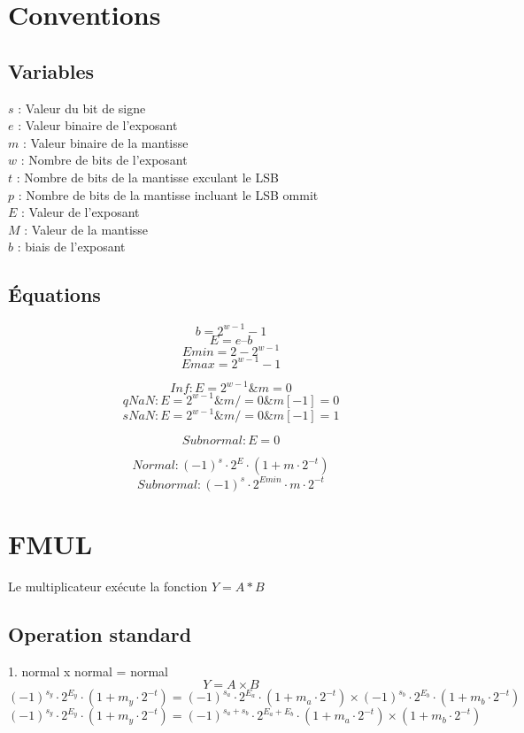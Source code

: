 \documentclass[letterpaper, 12pt]{article}
\begin{document}

\section{Conventions}

\subsection{Variables}
$s$ : Valeur du bit de signe\\
$e$ : Valeur binaire de l'exposant\\
$m$ : Valeur binaire de la mantisse\\
$w$ : Nombre de bits de l'exposant\\
$t$ : Nombre de bits de la mantisse exculant le LSB\\
$p$ : Nombre de bits de la mantisse incluant le LSB ommit\\
$E$ : Valeur de l’exposant\\
$M$ : Valeur de la mantisse\\
$b$ : biais de l'exposant\\

\subsection{Équations}

$$b = 2^{w-1}-1$$
$$E = e – b$$
$$Emin = 2-2^{w-1}$$
$$Emax = 2^{w-1}-1$$

$$Inf : E=2^{w-1} \& m=0$$
$$qNaN : E=2^{w-1} \& m/=0 \& m[-1]=0$$
$$sNaN : E=2^{w-1} \& m/=0 \& m[-1]=1$$

$$Subnormal: E=0$$

$$Normal : (-1)^s \cdot 2^E \cdot (1 + m \cdot 2^{-t})$$
$$Subnormal : (-1)^s \cdot 2^{Emin} \cdot m \cdot 2^{-t}$$

\section{FMUL}

Le multiplicateur exécute la fonction $Y = A * B$

\subsection{Operation standard}
1. normal x normal = normal
$$ Y = A \times B $$
$$ (-1)^{s_y} \cdot 2^{E_y} \cdot (1 + m_y\cdot2^{-t}) = (-1)^{s_a} \cdot 2^{E_a} \cdot (1 + m_a \cdot 2^{-t}) \times (-1)^{s_b} \cdot 2^{E_b} \cdot (1 + m_b \cdot 2^{-t})$$
$$ (-1)^{s_y} \cdot 2^{E_y} \cdot (1 + m_y\cdot2^{-t}) = (-1)^{s_a+s_b} \cdot 2^{E_a+E_b} \cdot (1 + m_a \cdot 2^{-t}) \times (1 + m_b \cdot 2^{-t})$$
\end{document}

